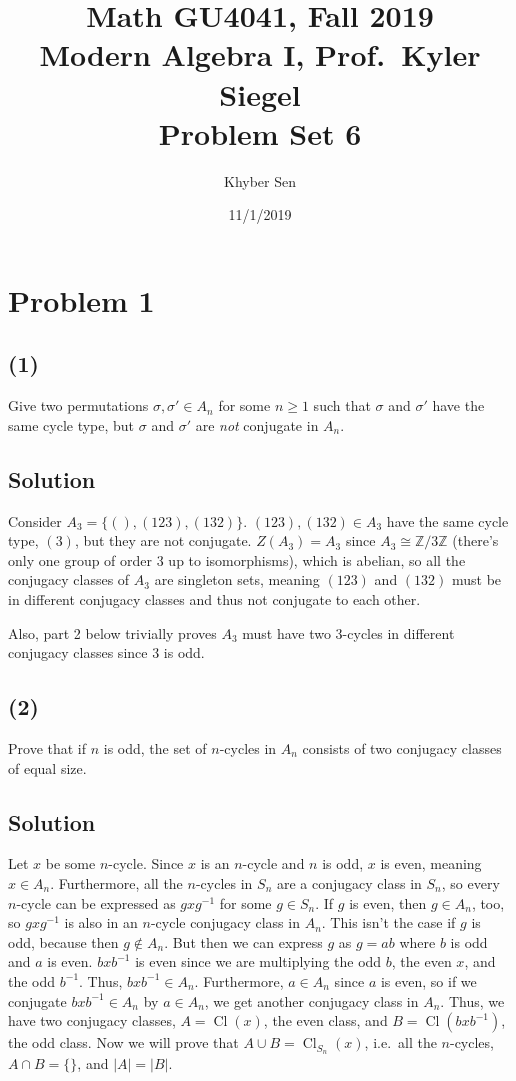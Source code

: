 \documentclass[fleqn]{article}
\title{
Math GU4041, Fall 2019 \\
Modern Algebra I, Prof.\ Kyler Siegel \\
Problem Set 6
}
\author{Khyber Sen}
\date{11/1/2019}
\DeclareMathOperator{\Cl}{Cl}
\begin{document}
    
    \maketitle
    
    \section{Problem 1}
        
        \subsection{(1)}
        Give two permutations $\sigma, \sigma' \in A_n$ for some $n \geq 1$ such that $\sigma$ and $\sigma'$ have the same cycle type, but $\sigma$ and $\sigma'$ are \textit{not} conjugate in $A_n$.
            
            \subsection{Solution}
            Consider $A_3 = \{(), (123), (132)\}$.  $(123), (132) \in A_3$ have the same cycle type, $(3)$, but they are not conjugate.  $Z(A_3) = A_3$ since $A_3 \cong \mathbb{Z}/3\mathbb{Z}$ (there's only one group of order 3 up to isomorphisms), which is abelian, so all the conjugacy classes of $A_3$ are singleton sets, meaning $(123)$ and $(132)$ must be in different conjugacy classes and thus not conjugate to each other.
            
            Also, part 2 below trivially proves $A_3$ must have two 3-cycles in different conjugacy classes since 3 is odd.
        
        \subsection{(2)}
        Prove that if $n$ is odd, the set of $n$-cycles in $A_n$ consists of two conjugacy classes of equal size.
            
            \subsection{Solution}
            Let $x$ be some $n$-cycle.  Since $x$ is an $n$-cycle and $n$ is odd, $x$ is even, meaning $x \in A_n$.  Furthermore, all the $n$-cycles in $S_n$ are a conjugacy class in $S_n$, so every $n$-cycle can be expressed as $gxg^{-1}$ for some $g \in S_n$.  If $g$ is even, then $g \in A_n$, too, so $gxg^{-1}$ is also in an $n$-cycle conjugacy class in $A_n$.  This isn't the case if $g$ is odd, because then $g \notin A_n$.  But then we can express $g$ as $g = ab$ where $b$ is odd and $a$ is even.  $bxb^{-1}$ is even since we are multiplying the odd $b$, the even $x$, and the odd $b^{-1}$.  Thus, $bxb^{-1} \in A_n$.  Furthermore, $a \in A_n$ since $a$ is even, so if we conjugate $bxb^{-1} \in A_n$ by $a \in A_n$, we get another conjugacy class in $A_n$.  Thus, we have two conjugacy classes, $A = \Cl(x)$, the even class, and $B = \Cl(bxb^{-1})$, the odd class.  Now we will prove that $A \cup B = \Cl_{S_n}(x)$, i.e.\ all the $n$-cycles, $A \cap B = \{\}$, and $|A| = |B|$.
            
\end{document}
